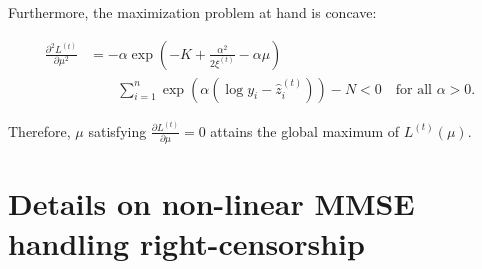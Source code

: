 Furthermore, the maximization problem at hand is concave: 


\begin{equation}
\begin{split}
\frac{\partial^2 L^{(t)}}{\partial \mu^2} & = - \alpha \exp \left( -K + \frac{\alpha^2}{2 \xi^{(t)}} - \alpha \mu \right) \\
& \qquad \sum_{i=1}^{n} \exp \left( \alpha (\log y_i - \hat{z}_i^{(t)}) \right) - N < 0 \quad \text{for all } \alpha > 0.
\end{split}
\end{equation}

Therefore, $\mu$ satisfying $\frac{\partial L^{(t)}}{\partial \mu} = 0$ attains the global maximum of $L^{(t)}(\mu)$. 

\clearpage

\section{Details on non-linear MMSE handling right-censorship}
\label{sec:sup2}

